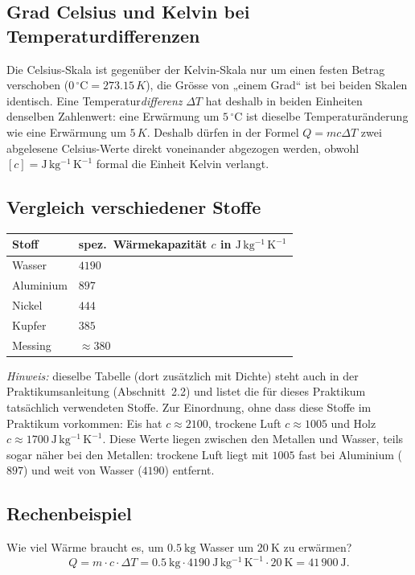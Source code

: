 \documentclass[11pt,a4paper]{article}
\newcommand{\Temp}{T}
\newcommand{\celsius}{\ensuremath{^{\circ}\mathrm{C}}}
\newcommand{\kelvin}{K}
\begin{document}
\subsection{Grad Celsius und Kelvin bei Temperaturdifferenzen}
Die Celsius-Skala ist gegenüber der Kelvin-Skala nur um einen festen Betrag verschoben ($0\,\celsius = 273.15\,\kelvin$), die Grösse von „einem Grad“ ist bei beiden Skalen identisch. Eine Temperatur\emph{differenz} $\Delta\Temp$ hat deshalb in beiden Einheiten denselben Zahlenwert: eine Erwärmung um $5\,\celsius$ ist dieselbe Temperaturänderung wie eine Erwärmung um $5\,\kelvin$. Deshalb dürfen in der Formel $Q=mc\Delta\Temp$ zwei abgelesene Celsius-Werte direkt voneinander abgezogen werden, obwohl $[c]=\mathrm{J\,kg^{-1}\,K^{-1}}$ formal die Einheit Kelvin verlangt.

\subsection{Vergleich verschiedener Stoffe}
\begin{center}
\renewcommand{\arraystretch}{1.25}
\begin{tabularx}{0.75\linewidth}{@{}Xl@{}}
  \toprule
  \textbf{Stoff} & \textbf{spez.\ Wärmekapazität $c$ in $\mathrm{J\,kg^{-1}\,K^{-1}}$} \\
  \midrule
  Wasser & $4190$ \\
  Aluminium & $897$ \\
  Nickel & $444$ \\
  Kupfer & $385$ \\
  Messing & $\approx 380$ \\
  \bottomrule
\end{tabularx}
\end{center}
\emph{Hinweis:} dieselbe Tabelle (dort zusätzlich mit Dichte) steht auch in der Praktikumsanleitung (Abschnitt~2.2) und listet die für dieses Praktikum tatsächlich verwendeten Stoffe. Zur Einordnung, ohne dass diese Stoffe im Praktikum vorkommen: Eis hat $c\approx 2100$, trockene Luft $c\approx 1005$ und Holz $c\approx 1700\ \mathrm{J\,kg^{-1}\,K^{-1}}$. Diese Werte liegen zwischen den Metallen und Wasser, teils sogar näher bei den Metallen: trockene Luft liegt mit $1005$ fast bei Aluminium ($897$) und weit von Wasser ($4190$) entfernt.

\subsection{Rechenbeispiel}
Wie viel Wärme braucht es, um $0.5\ \mathrm{kg}$ Wasser um $20\ \mathrm{K}$ zu erwärmen?
\[
  Q = m \cdot c \cdot \Delta\Temp = 0.5\ \mathrm{kg} \cdot 4190\ \mathrm{J\,kg^{-1}\,K^{-1}} \cdot 20\ \mathrm{K} = 41\,900\ \mathrm{J}.
\]
\end{document}
